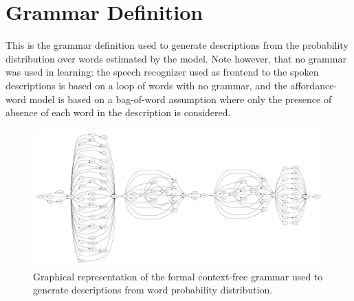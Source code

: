 \section{Grammar Definition}
This is the grammar definition used to generate descriptions from the probability distribution over words estimated by the model.
Note however, that no grammar was used in learning: the speech recognizer used as frontend to the spoken descriptions is based on a loop of words with no grammar, and the affordance-word model is based on a bag-of-word assumption where only the presence of absence of each word in the description is considered.

\begin{figure}
  \includegraphics[width=\textwidth, angle=90]{figures/grammar}
  \caption{Graphical representation of the formal context-free grammar used to generate descriptions from word probability distribution.}
\end{figure}


